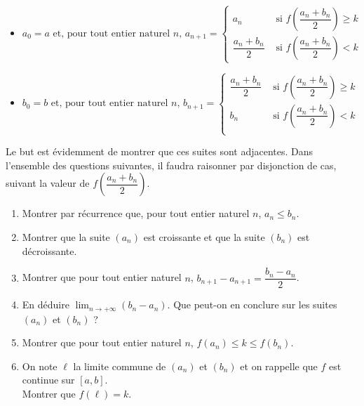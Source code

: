 \documentclass[11pt,fleqn, openany]{book} %
\begin{document}
\begin{exercise}[subtitle={(Démontrer le théorème des valeurs intermédiaires)}]
\begin{itemize}
\item $ a_0 = a 
\text{ et, pour tout entier naturel }n,\, a_{n+1} = \left\{ \begin{array}{ll} a_n& \text{ si } f\left(\dfrac{a_n+b_n}{2}\right) \geqslant k \\ \dfrac{a_n +b_n}{2} &\text{ si } f\left(\dfrac{a_n+b_n}{2}\right) < k \end{array}\right.$
\vskip5pt
\item $ b_0 = b
\text{ et, pour tout entier naturel }n,\, b_{n+1} = \left\{ \begin{array}{ll} \dfrac{a_n +b_n}{2} & \text{ si } f\left(\dfrac{a_n+b_n}{2}\right) \geqslant k \\
b_n &\text{ si } f\left(\dfrac{a_n+b_n}{2}\right) < k \\  \end{array}\right.$
\end{itemize}

Le but est évidemment de montrer que ces suites sont adjacentes. Dans l'ensemble des questions suivantes, il faudra raisonner par disjonction de cas, suivant la valeur de $f\left(\dfrac{a_n+b_n}{2}\right)$.

\begin{enumerate}
\item Montrer par récurrence que, pour tout entier naturel $n$, $a_n \leqslant b_n$. 
\item Montrer que la suite $(a_n)$ est croissante et que la suite $(b_n)$ est décroissante.
\item Montrer que pour tout entier naturel $n$, $b_{n+1}-a_{n+1}=\dfrac{b_n-a_n}{2}$.
\item En déduire $\displaystyle\lim_{n \to + \infty}(b_n-a_n)$. Que peut-on en conclure sur les suites $(a_n)$ et $(b_n)$ ?
\item Montrer que pour tout entier naturel $n$, $f(a_n) \leqslant k \leqslant f(b_n)$.
\item On note $\ell$ la limite commune de $(a_n)$ et $(b_n)$ et on rappelle que $f$ est continue sur $[a,b]$.\\ Montrer que $f(\ell)=k$.
\end{enumerate}

\end{exercise}
\end{document}
